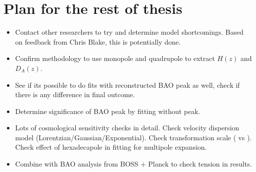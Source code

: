\documentclass[titlesmallcaps, examinerscopy, copyrightpage]{uqthesis}
\newcommand{\green}{\color{LimeGreen}}
\begin{document}
\chapter{Plan for the rest of thesis}
\begin{itemize}
\item Contact other researchers to try and determine model shortcomings. {\green Based on feedback from Chris Blake, this is potentially done.}
\item Confirm methodology to use monopole and quadrupole to extract $H(z)$ and $D_A(z)$.
\item See if its possible to do fits with reconstructed BAO peak as well, check if there is any difference in final outcome.
\item Determine significance of BAO peak by fitting without peak.
\item Lots of cosmological sensitivity checks in detail. Check velocity dispersion model (Lorentzian/Gaussian/Exponential). Check transformation scale (\citet{KazinSanchezBlanton2012} vs \citet{XuCuesta2013}). Check effect of hexadecapole in fitting for multipole expansion.
\item Combine with BAO analysis from BOSS + Planck to check tension in results.
\end{itemize}











\end{document}
